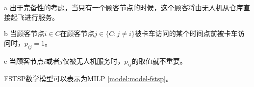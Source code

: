 \begin{table}[!htbp]
\begin{threeparttable}
\begin{tabularx}{\textwidth}{lX}
        \bottomrule[1pt] %
    \end{tabularx}
    \begin{tablenotes}
        \footnotesize %
        \item[a] \hypertarget{tab:fstsp-item-1}{}出于完备性的考虑，当只有一个顾客节点的时候，这个顾客将由无人机从仓库直接起飞进行服务。
        \item[b] \hypertarget{tab:fstsp-item-2}{}当顾客节点$i \in C$在顾客节点$j \in\{C:j \neq i\}$被卡车访问的某个时间点前被卡车访问时，$p_{ij} = 1$。
        \item[c] \hypertarget{tab:fstsp-item-3}{}当顾客节点$i$或者$j$仅被无人机服务时，$p_{ij}$的取值就不重要。
    \end{tablenotes}
    \end{threeparttable}
\end{table}

FSTSP数学模型可以表示为MILP \ref{model:model-fstsp}。

